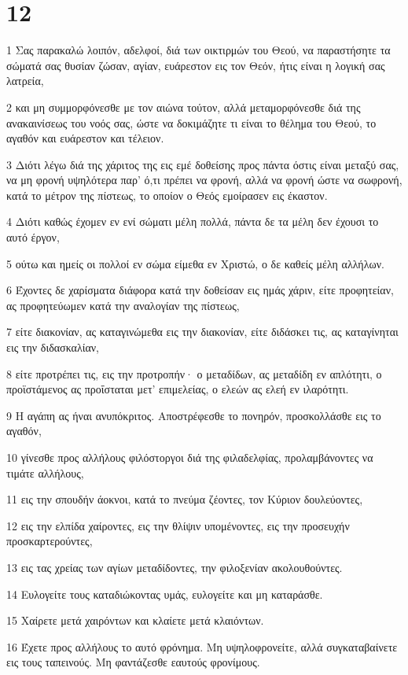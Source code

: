 \chapter{12}

\par 1 Σας παρακαλώ λοιπόν, αδελφοί, διά των οικτιρμών του Θεού, να παραστήσητε τα σώματά σας θυσίαν ζώσαν, αγίαν, ευάρεστον εις τον Θεόν, ήτις είναι η λογική σας λατρεία,
\par 2 και μη συμμορφόνεσθε με τον αιώνα τούτον, αλλά μεταμορφόνεσθε διά της ανακαινίσεως του νοός σας, ώστε να δοκιμάζητε τι είναι το θέλημα του Θεού, το αγαθόν και ευάρεστον και τέλειον.
\par 3 Διότι λέγω διά της χάριτος της εις εμέ δοθείσης προς πάντα όστις είναι μεταξύ σας, να μη φρονή υψηλότερα παρ' ό,τι πρέπει να φρονή, αλλά να φρονή ώστε να σωφρονή, κατά το μέτρον της πίστεως, το οποίον ο Θεός εμοίρασεν εις έκαστον.
\par 4 Διότι καθώς έχομεν εν ενί σώματι μέλη πολλά, πάντα δε τα μέλη δεν έχουσι το αυτό έργον,
\par 5 ούτω και ημείς οι πολλοί εν σώμα είμεθα εν Χριστώ, ο δε καθείς μέλη αλλήλων.
\par 6 Έχοντες δε χαρίσματα διάφορα κατά την δοθείσαν εις ημάς χάριν, είτε προφητείαν, ας προφητεύωμεν κατά την αναλογίαν της πίστεως,
\par 7 είτε διακονίαν, ας καταγινώμεθα εις την διακονίαν, είτε διδάσκει τις, ας καταγίνηται εις την διδασκαλίαν,
\par 8 είτε προτρέπει τις, εις την προτροπήν· ο μεταδίδων, ας μεταδίδη εν απλότητι, ο προϊστάμενος ας προΐσταται μετ' επιμελείας, ο ελεών ας ελεή εν ιλαρότητι.
\par 9 Η αγάπη ας ήναι ανυπόκριτος. Αποστρέφεσθε το πονηρόν, προσκολλάσθε εις το αγαθόν,
\par 10 γίνεσθε προς αλλήλους φιλόστοργοι διά της φιλαδελφίας, προλαμβάνοντες να τιμάτε αλλήλους,
\par 11 εις την σπουδήν άοκνοι, κατά το πνεύμα ζέοντες, τον Κύριον δουλεύοντες,
\par 12 εις την ελπίδα χαίροντες, εις την θλίψιν υπομένοντες, εις την προσευχήν προσκαρτερούντες,
\par 13 εις τας χρείας των αγίων μεταδίδοντες, την φιλοξενίαν ακολουθούντες.
\par 14 Ευλογείτε τους καταδιώκοντας υμάς, ευλογείτε και μη καταράσθε.
\par 15 Χαίρετε μετά χαιρόντων και κλαίετε μετά κλαιόντων.
\par 16 Έχετε προς αλλήλους το αυτό φρόνημα. Μη υψηλοφρονείτε, αλλά συγκαταβαίνετε εις τους ταπεινούς. Μη φαντάζεσθε εαυτούς φρονίμους.

